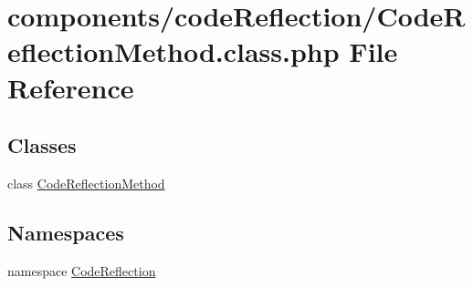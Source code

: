 \hypertarget{_code_reflection_method_8class_8php}{
\section{components/codeReflection/CodeReflectionMethod.class.php File Reference}
\label{_code_reflection_method_8class_8php}
}
\subsection*{Classes}
\begin{CompactItemize}
\item 
class \hyperlink{class_code_reflection_method}{CodeReflectionMethod}
\end{CompactItemize}
\subsection*{Namespaces}
\begin{CompactItemize}
\item 
namespace \hyperlink{namespace_code_reflection}{CodeReflection}
\end{CompactItemize}
